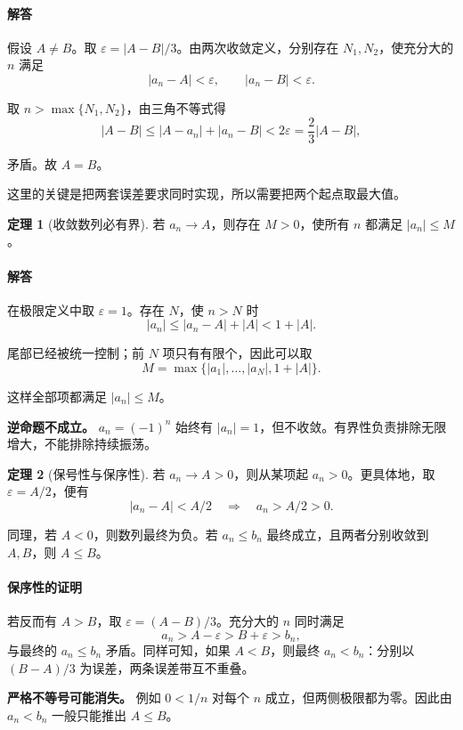 \documentclass[UTF8,fontset=fandol,12pt,oneside,openany]{ctexrep}
\theoremstyle{definition}
\newtheorem{theorem}{定理}[chapter]
\begin{document}
\paragraph{解答} 假设 $A\ne B$。取 $\varepsilon=|A-B|/3$。由两次收敛定义，分别存在 $N_1,N_2$，使充分大的 $n$ 满足
\[
|a_n-A|<\varepsilon,\qquad |a_n-B|<\varepsilon.
\]

取 $n>\max\{N_1,N_2\}$，由三角不等式得
\[
|A-B|\le|A-a_n|+|a_n-B|<2\varepsilon=\frac23|A-B|,
\]

矛盾。故 $A=B$。

这里的关键是把两套误差要求同时实现，所以需要把两个起点取最大值。

\begin{theorem}[收敛数列必有界]
若 $a_n\to A$，则存在 $M>0$，使所有 $n$ 都满足 $|a_n|\le M$。
\end{theorem}

\paragraph{解答} 在极限定义中取 $\varepsilon=1$。存在 $N$，使 $n>N$ 时
\[
|a_n|\le|a_n-A|+|A|<1+|A|.
\]

尾部已经被统一控制；前 $N$ 项只有有限个，因此可以取
\[
M=\max\{|a_1|,\ldots,|a_N|,1+|A|\}.
\]

这样全部项都满足 $|a_n|\le M$。

\textbf{逆命题不成立。} $a_n=(-1)^n$ 始终有 $|a_n|=1$，但不收敛。有界性负责排除无限增大，不能排除持续振荡。

\begin{theorem}[保号性与保序性]
若 $a_n\to A>0$，则从某项起 $a_n>0$。更具体地，取 $\varepsilon=A/2$，便有
\[
|a_n-A|<A/2\quad\Longrightarrow\quad a_n>A/2>0.
\]
\end{theorem}

同理，若 $A<0$，则数列最终为负。若 $a_n\le b_n$ 最终成立，且两者分别收敛到 $A,B$，则 $A\le B$。

\paragraph{保序性的证明} 若反而有 $A>B$，取 $\varepsilon=(A-B)/3$。充分大的 $n$ 同时满足
\[
a_n>A-\varepsilon>B+\varepsilon>b_n,
\]
与最终的 $a_n\le b_n$ 矛盾。同样可知，如果 $A<B$，则最终 $a_n<b_n$：分别以 $(B-A)/3$ 为误差，两条误差带互不重叠。

\textbf{严格不等号可能消失。} 例如 $0<1/n$ 对每个 $n$ 成立，但两侧极限都为零。因此由 $a_n<b_n$ 一般只能推出 $A\le B$。
\end{document}
